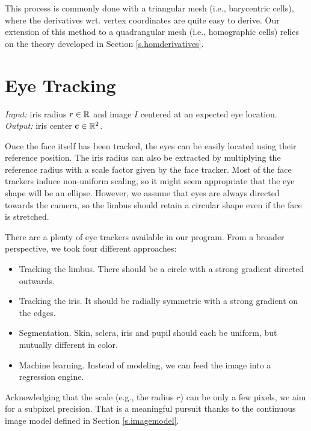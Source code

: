 This process is commonly done with a triangular mesh (i.e., barycentric cells), where the derivatives wrt. vertex coordinates are quite easy to derive.
Our extension of this method to a quadrangular mesh (i.e., homographic cells) relies on the theory developed in Section \ref{s.homderivatives}.

\section{Eye Tracking}

\textit{Input:} iris radius $r \in \mathbb{R}$ and image $I$ centered at an expected eye location.\\
\textit{Output:} iris center $\mathbf{c} \in \mathbb{R}^2$.\\


Once the face itself has been tracked, the eyes can be easily located using their reference position.
The iris radius can also be extracted by multiplying the reference radius with a scale factor given by the face tracker.
Most of the face trackers induce non-uniform scaling, so it might seem appropriate that the eye shape will be an ellipse.
However, we assume that eyes are always directed towards the camera, so the limbus should retain a circular shape even if the face is stretched.


There are a plenty of eye trackers available in our program.
From a broader perspective, we took four different approaches:
\begin{itemize}
\item Tracking the limbus. There should be a circle with a strong gradient directed outwards.
\item Tracking the iris. It should be radially symmetric with a strong gradient on the edges.
\item Segmentation. Skin, sclera, iris and pupil should each be uniform, but mutually different in color.
\item Machine learning. Instead of modeling, we can feed the image into a regression engine.
\end{itemize}

Acknowledging that the scale (e.g., the radius $r$) can be only a few pixels, we aim for a subpixel precision.
That is a meaningful pursuit thanks to the continuous image model defined in Section \ref{s.imagemodel}.

